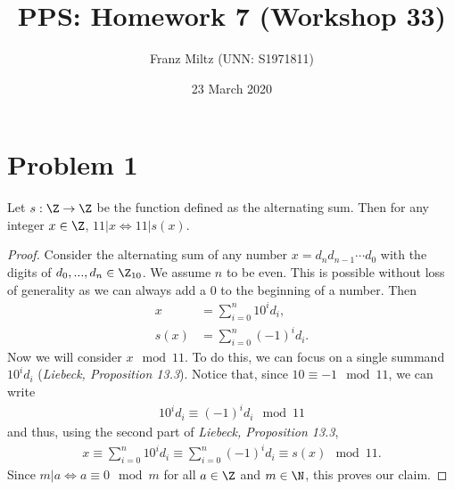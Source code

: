 \documentclass{article}
\title{PPS: Homework 7 (Workshop 33)}
\author{Franz Miltz (UNN: S1971811)}
\date{23 March 2020}
\begin{document}
\maketitle
\section*{Problem 1}
\begin{claim}
  Let $s:\Z \to \Z$ be the function defined as the alternating sum. Then for any integer $x\in\Z$, $11|x \Leftrightarrow 11|s(x)$.
\end{claim}
\begin{proof}
  Consider the alternating sum of any number $x=d_nd_{n-1}\cdots d_0$ with the digits of $d_0,...,d_n\in\Z_{10}$.
  We assume $n$ to be even. This is possible without loss of generality as we can always add a $0$ to the beginning of a number.
  Then
  \begin{align*}
    x    & = \sum_{i=0}^n 10^id_i,   \\
    s(x) & = \sum_{i=0}^n (-1)^id_i.
  \end{align*}
  Now we will consider $x\mod 11$. To do this, we can focus on a single summand $10^id_i$ (\emph{Liebeck, Proposition 13.3}).
  Notice that, since $10\equiv -1 \mod 11$, we can write
  \begin{align*}
    10^id_i \equiv (-1)^id_i \mod 11
  \end{align*}
  and thus, using the second part of \emph{Liebeck, Proposition 13.3},
  \begin{align*}
    x \equiv \sum_{i=0}^n 10^id_i \equiv \sum_{i=0}^n (-1)^id_i\equiv s(x)\mod 11.
  \end{align*}
  Since $m|a\Leftrightarrow a\equiv 0 \mod m$ for all $a\in\Z$ and $m\in\N$, this proves our claim.
\end{proof}
\end{document}
